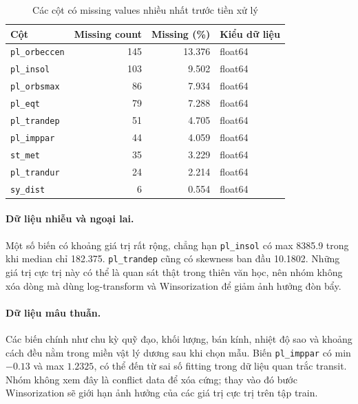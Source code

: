 \begin{table}[H]
\centering
\caption{Các cột có missing values nhiều nhất trước tiền xử lý}
\label{tab:part2_missing_eda}
\begin{tabular}{@{}lrrl@{}}
\hline
\textbf{Cột} & \textbf{Missing count} & \textbf{Missing (\%)} & \textbf{Kiểu dữ liệu} \\
\hline
\texttt{pl\_orbeccen} & 145 & 13.376 & float64 \\
\texttt{pl\_insol} & 103 & 9.502 & float64 \\
\texttt{pl\_orbsmax} & 86 & 7.934 & float64 \\
\texttt{pl\_eqt} & 79 & 7.288 & float64 \\
\texttt{pl\_trandep} & 51 & 4.705 & float64 \\
\texttt{pl\_imppar} & 44 & 4.059 & float64 \\
\texttt{st\_met} & 35 & 3.229 & float64 \\
\texttt{pl\_trandur} & 24 & 2.214 & float64 \\
\texttt{sy\_dist} & 6 & 0.554 & float64 \\
\hline
\end{tabular}
\end{table}

\paragraph{Dữ liệu nhiễu và ngoại lai.}
Một số biến có khoảng giá trị rất rộng, chẳng hạn \texttt{pl\_insol} có max 8385.9 trong khi median
chỉ 182.375. \texttt{pl\_trandep} cũng có skewness ban đầu 10.1802. Những giá trị cực trị này có
thể là quan sát thật trong thiên văn học, nên nhóm không xóa dòng mà dùng log-transform và
Winsorization để giảm ảnh hưởng đòn bẩy.

\paragraph{Dữ liệu mâu thuẫn.}
Các biến chính như chu kỳ quỹ đạo, khối lượng, bán kính, nhiệt độ sao và khoảng cách đều nằm trong
miền vật lý dương sau khi chọn mẫu. Biến \texttt{pl\_imppar} có min $-0.13$ và max $1.2325$, có thể
đến từ sai số fitting trong dữ liệu quan trắc transit. Nhóm không xem đây là conflict data để xóa
cứng; thay vào đó bước Winsorization sẽ giới hạn ảnh hưởng của các giá trị cực trị trên tập train.


